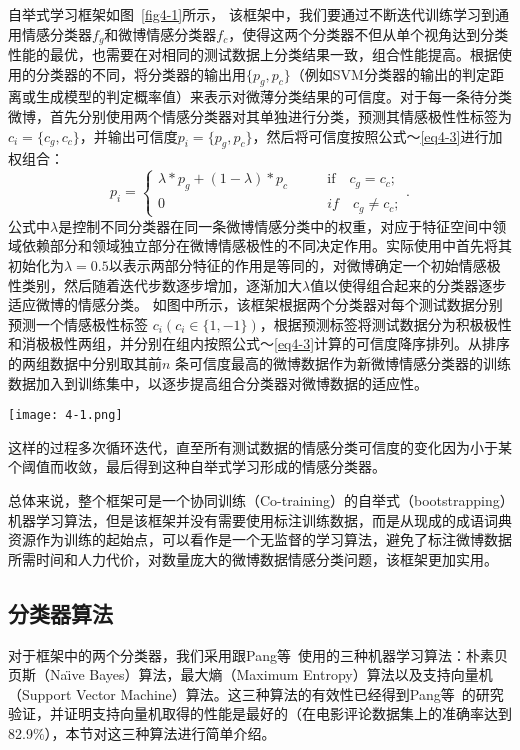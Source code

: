 自举式学习框架如图~\ref{fig4-1}所示，
该框架中，我们要通过不断迭代训练学习到通用情感分类器$ f_{g} $和微博情感分类器$ f_{c} $，使得这两个分类器不但从单个视角达到分类性能的最优，也需要在对相同的测试数据上分类结果一致，组合性能提高。根据使用的分类器的不同，将分类器的输出用$  \lbrace p_{g},p_{c}\rbrace$（例如SVM分类器的输出的判定距离或生成模型的判定概率值）来表示对微薄分类结果的可信度。对于每一条待分类微博，首先分别使用两个情感分类器对其单独进行分类，预测其情感极性性标签为$ c_{i}=\lbrace c_{g},c_{c}\rbrace $，并输出可信度$ p_{i}= \lbrace p_{g},p_{c}\rbrace$，然后将可信度按照公式～\ref{eq4-3}进行加权组合：
\begin{equation}
\label{eq4-3}
p_{i}=\begin{cases}
\lambda\ast p_{g} + \left( 1-\lambda \right) \ast p_{c}&  \qquad \mbox{if} \quad c_{g}=c_{c};\\
0&  \qquad \textit{if} \quad c_{g} \neq c_{c};
\end{cases}.
\end{equation}
公式中$ \lambda $是控制不同分类器在同一条微博情感分类中的权重，对应于特征空间中领域依赖部分和领域独立部分在微博情感极性的不同决定作用。实际使用中首先将其初始化为$ \lambda = 0.5 $以表示两部分特征的作用是等同的，对微博确定一个初始情感极性类别，然后随着迭代步数逐步增加，逐渐加大$ \lambda $值以使得组合起来的分类器逐步适应微博的情感分类。
如图中所示，该框架根据两个分类器对每个测试数据分别预测一个情感极性标签 $ c_{i} \left( c_{i} \in \lbrace 1, -1\rbrace \right)$，根据预测标签将测试数据分为积极极性和消极极性两组，并分别在组内按照公式～\ref{eq4-3}计算的可信度降序排列。从排序的两组数据中分别取其前$ n $ 条可信度最高的微博数据作为新微博情感分类器的训练数据加入到训练集中，以逐步提高组合分类器对微博数据的适应性。
\begin{landscape}
\begin{figure*}[htp] 
\centering%
\texttt{[image: 4-1.png]}
\caption{自举式学习框架}
\label{fig4-1}
\end{figure*}
\end{landscape}
这样的过程多次循环迭代，直至所有测试数据的情感分类可信度的变化因为小于某个阈值而收敛，最后得到这种自举式学习形成的情感分类器。

总体来说，整个框架可是一个协同训练（Co-training）的自举式（bootstrapping）机器学习算法，但是该框架并没有需要使用标注训练数据，而是从现成的成语词典资源作为训练的起始点，可以看作是一个无监督的学习算法，避免了标注微博数据所需时间和人力代价，对数量庞大的微博数据情感分类问题，该框架更加实用。

\subsection{分类器算法}
\label{classifier}
对于框架中的两个分类器，我们采用跟Pang等~使用的三种机器学习算法：朴素贝页斯（Na\"\i ve Bayes）算法，最大熵（Maximum Entropy）算法以及支持向量机（Support Vector Machine）算法。这三种算法的有效性已经得到Pang等~的研究验证，并证明支持向量机取得的性能是最好的（在电影评论数据集上的准确率达到82.9\%），本节对这三种算法进行简单介绍。

